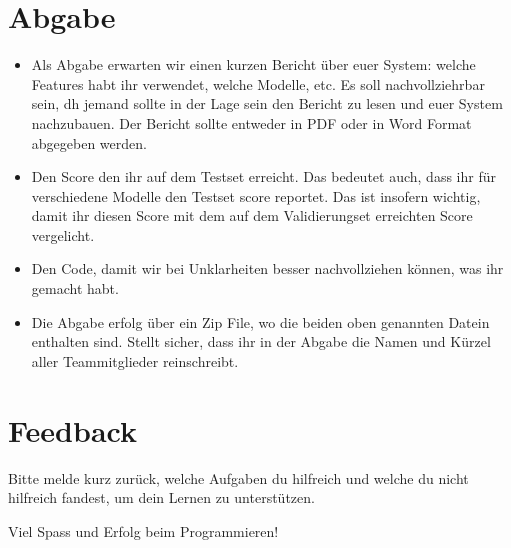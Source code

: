\documentclass[a4paper,10pt]{article}
\begin{document}
\section{Abgabe}
\begin{itemize}
\item Als Abgabe erwarten wir einen kurzen Bericht über euer System: welche Features habt ihr verwendet, welche Modelle, etc. Es soll nachvollziehrbar sein, dh jemand sollte in der Lage sein den Bericht zu lesen und euer System nachzubauen. Der Bericht sollte entweder in PDF oder in Word Format abgegeben werden. 
\item Den Score den ihr auf dem Testset erreicht. Das bedeutet auch, dass ihr für verschiedene Modelle den Testset score reportet. Das ist insofern wichtig, damit ihr diesen Score mit dem auf dem Validierungset erreichten Score vergelicht.
\item Den Code, damit wir bei Unklarheiten besser nachvollziehen können, was ihr gemacht habt.
\item Die Abgabe erfolg über ein Zip File, wo die beiden oben genannten Datein enthalten sind. Stellt sicher, dass ihr in der Abgabe die Namen und Kürzel aller Teammitglieder reinschreibt.
\end{itemize}
\section{Feedback}
Bitte melde kurz zurück, welche Aufgaben du hilfreich und welche du nicht hilfreich fandest, um dein Lernen zu unterstützen.

\hfil Viel Spass und Erfolg beim Programmieren!
\end{document}
